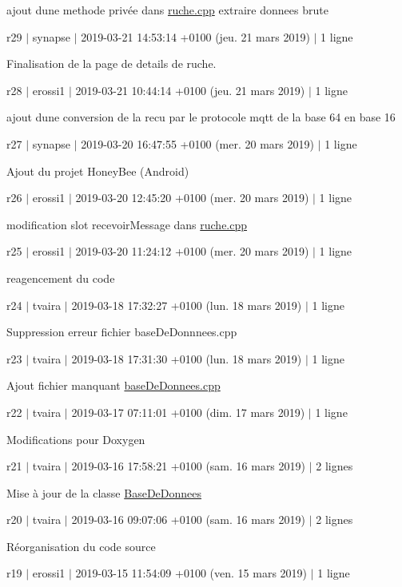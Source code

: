 ajout d\textquotesingle{}une methode privée dans \hyperlink{ruche_8cpp}{ruche.\+cpp} extraire donnees brute

r29 $\vert$ synapse $\vert$ 2019-\/03-\/21 14\+:53\+:14 +0100 (jeu. 21 mars 2019) $\vert$ 1 ligne

Finalisation de la page de details de ruche.

r28 $\vert$ erossi1 $\vert$ 2019-\/03-\/21 10\+:44\+:14 +0100 (jeu. 21 mars 2019) $\vert$ 1 ligne

ajout d\textquotesingle{}une conversion de la recu par le protocole mqtt de la base 64 en base 16

r27 $\vert$ synapse $\vert$ 2019-\/03-\/20 16\+:47\+:55 +0100 (mer. 20 mars 2019) $\vert$ 1 ligne

Ajout du projet Honey\+Bee (Android)

r26 $\vert$ erossi1 $\vert$ 2019-\/03-\/20 12\+:45\+:20 +0100 (mer. 20 mars 2019) $\vert$ 1 ligne

modification slot recevoir\+Message dans \hyperlink{ruche_8cpp}{ruche.\+cpp}

r25 $\vert$ erossi1 $\vert$ 2019-\/03-\/20 11\+:24\+:12 +0100 (mer. 20 mars 2019) $\vert$ 1 ligne

reagencement du code

r24 $\vert$ tvaira $\vert$ 2019-\/03-\/18 17\+:32\+:27 +0100 (lun. 18 mars 2019) $\vert$ 1 ligne

Suppression erreur fichier base\+De\+Donnnees.\+cpp

r23 $\vert$ tvaira $\vert$ 2019-\/03-\/18 17\+:31\+:30 +0100 (lun. 18 mars 2019) $\vert$ 1 ligne

Ajout fichier manquant \hyperlink{base_de_donnees_8cpp}{base\+De\+Donnees.\+cpp}

r22 $\vert$ tvaira $\vert$ 2019-\/03-\/17 07\+:11\+:01 +0100 (dim. 17 mars 2019) $\vert$ 1 ligne

Modifications pour Doxygen

r21 $\vert$ tvaira $\vert$ 2019-\/03-\/16 17\+:58\+:21 +0100 (sam. 16 mars 2019) $\vert$ 2 lignes

Mise à jour de la classe \hyperlink{class_base_de_donnees}{Base\+De\+Donnees}

r20 $\vert$ tvaira $\vert$ 2019-\/03-\/16 09\+:07\+:06 +0100 (sam. 16 mars 2019) $\vert$ 2 lignes

Réorganisation du code source

r19 $\vert$ erossi1 $\vert$ 2019-\/03-\/15 11\+:54\+:09 +0100 (ven. 15 mars 2019) $\vert$ 1 ligne

